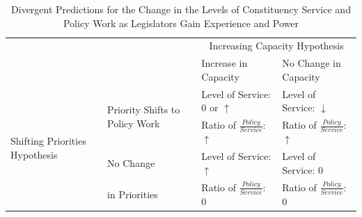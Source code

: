 \documentclass[12pt]{article}
\begin{document}
\renewcommand{\arraystretch}{1.2}%

\begin{table}[h]

\caption{Divergent Predictions for the Change in the Levels of Constituency Service and Policy Work as Legislators Gain Experience and Power}\label{t:theory}

\begin{tabular}[t]{p{.12\linewidth}|p{.18\linewidth}|p{.25\linewidth}|p{.25\linewidth}|}

\multicolumn{2}{l}{\multirow{2}{*}{}} & \multicolumn{2}{c}{Increasing Capacity Hypothesis} \\ \cline{3-4}

\multicolumn{2}{l|}{}    &  Increase in Capacity  &   No Change in Capacity \\ \cline{2-4} 

\multirow{4}{2cm}{Shifting Priorities Hypothesis}  &   \multirow{2}{3cm}{Priority Shifts to Policy Work}   &  Level of Service: 0 or $\uparrow$  &  Level of Service: $\downarrow$  \\ 

& &  Ratio of $\frac{Policy}{Service}$: $\uparrow$   &   Ratio of $\frac{Policy}{Service}$: $\uparrow$  \\ \cline{2-4}

 &  No Change    &  Level of Service: $\uparrow$  & Level of Service: $0$ \\ 

 & in Priorities &   Ratio of $\frac{Policy}{Service}$: $0$  & Ratio of $\frac{Policy}{Service}$: $0$\\ \cline{2-4}

\end{tabular}

\end{table}


\renewcommand{\arraystretch}{1}%
\end{document}
